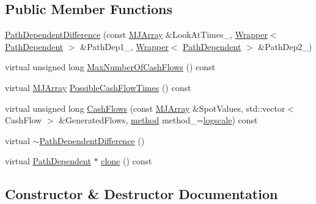 \subsection*{Public Member Functions}
\begin{DoxyCompactItemize}
\item 
\hyperlink{classPathDependentDifference_a607623461342b52781581d5eb783397d}{Path\+Dependent\+Difference} (const \hyperlink{classMJArray}{M\+J\+Array} \&Look\+At\+Times\+\_\+, \hyperlink{classWrapper}{Wrapper}$<$ \hyperlink{classPathDependent}{Path\+Dependent} $>$ \&Path\+Dep1\+\_\+, \hyperlink{classWrapper}{Wrapper}$<$ \hyperlink{classPathDependent}{Path\+Dependent} $>$ \&Path\+Dep2\+\_\+)
\item 
virtual unsigned long \hyperlink{classPathDependentDifference_a2548403f4f6b3425254cde6f263534a8}{Max\+Number\+Of\+Cash\+Flows} () const
\item 
virtual \hyperlink{classMJArray}{M\+J\+Array} \hyperlink{classPathDependentDifference_a70cb4e639817e4d4ad5ace6212c5eec9}{Possible\+Cash\+Flow\+Times} () const
\item 
virtual unsigned long \hyperlink{classPathDependentDifference_a6e4daf07ddd8d11da86bf18684874d6a}{Cash\+Flows} (const \hyperlink{classMJArray}{M\+J\+Array} \&Spot\+Values, std\+::vector$<$ Cash\+Flow $>$ \&Generated\+Flows, \hyperlink{PathDependent_8h_abed946c62f140eb7ff2ac742e6ad9497}{method} method\+\_\+=\hyperlink{PathDependent_8h_abed946c62f140eb7ff2ac742e6ad9497a064d3d3358889658ce07fe9f3191d1fd}{logscale}) const
\item 
virtual \hyperlink{classPathDependentDifference_a2ab8a92f874f6e4ee36f0803f924b00c}{$\sim$\+Path\+Dependent\+Difference} ()
\item 
virtual \hyperlink{classPathDependent}{Path\+Dependent} $\ast$ \hyperlink{classPathDependentDifference_a80b73ef2b45a79684153575f3f508dc5}{clone} () const
\end{DoxyCompactItemize}


\subsection{Constructor \& Destructor Documentation}
\hypertarget{classPathDependentDifference_a607623461342b52781581d5eb783397d}{}\label{classPathDependentDifference_a607623461342b52781581d5eb783397d} 

